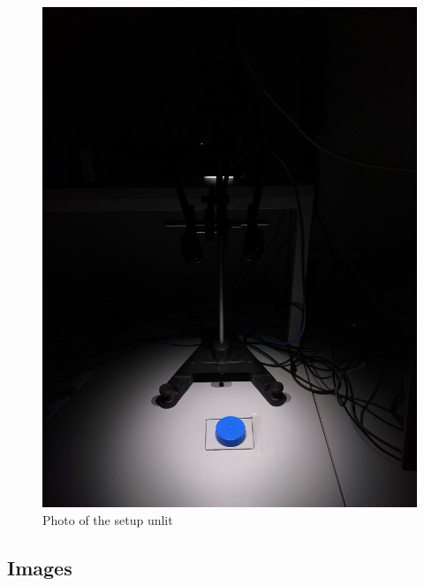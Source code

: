 \documentclass{article}
\begin{document}
\begin{figure}[h]
    \centering
    \includegraphics[width=1\textwidth]{figures/picture_taking_in_the_dark}
    \caption{Photo of the setup unlit}
    \label{fig:picture_of_setup_unlit}
\end{figure}


\subsection{Images}
\end{document}
